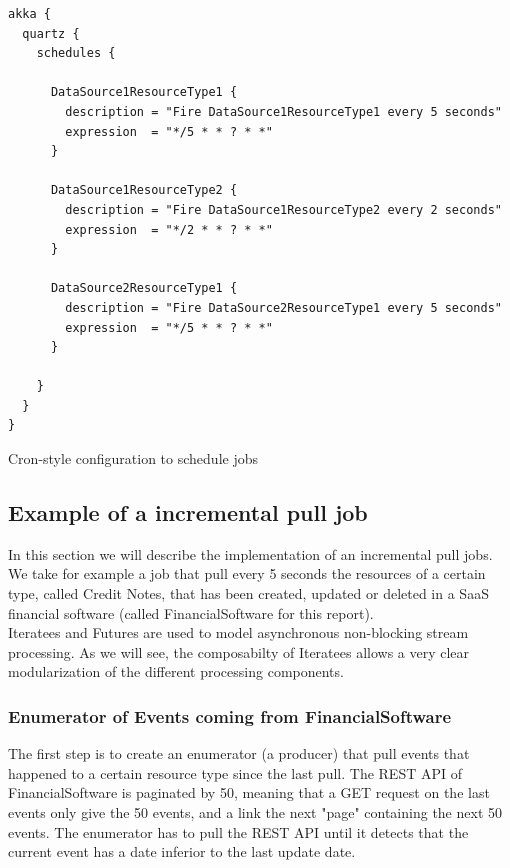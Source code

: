 \begin{listing}[h]
\begin{verbatim}
akka {
  quartz {
    schedules {

      DataSource1ResourceType1 {
        description = "Fire DataSource1ResourceType1 every 5 seconds"
        expression  = "*/5 * * ? * *"
      }

      DataSource1ResourceType2 {
        description = "Fire DataSource1ResourceType2 every 2 seconds"
        expression  = "*/2 * * ? * *"
      }

      DataSource2ResourceType1 {
        description = "Fire DataSource2ResourceType1 every 5 seconds"
        expression  = "*/5 * * ? * *"
      }
        
    }
  }
}
\end{verbatim}
\caption{Cron-style configuration to schedule jobs}
\label{lst:configquartz}
\end{listing}

\subsection{Example of a incremental pull job}

In this section we will describe the implementation of an incremental pull jobs. We take for example a job that pull every 5 seconds the resources of a certain type, called Credit Notes, that has been created, updated or deleted in a SaaS financial software (called FinancialSoftware for this report).
\\

Iteratees and Futures are used to model asynchronous non-blocking stream processing. As we will see, the composabilty of Iteratees allows a very clear modularization of the 
different processing components. 

\subsubsection{Enumerator of Events coming from FinancialSoftware}

The first step is to create an enumerator (a producer) that pull events that happened to a certain resource type since the last pull. The REST API
of FinancialSoftware is paginated by 50, meaning that a GET request on the last events only give the 50 events, and a link the next "page" containing the next 50 events.
The enumerator has to pull the REST API until it detects that the current event has a date inferior to the last update date.
\\

